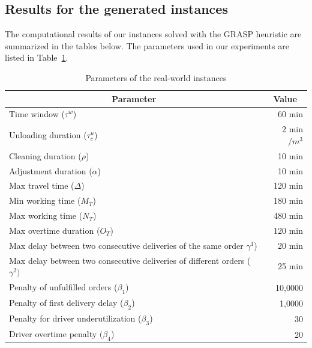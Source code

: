 \documentclass{article}
\begin{document}
\subsection{Results for the generated instances}

The computational results of our instances solved with the GRASP heuristic are summarized in the tables below. %
The parameters used in our experiments are listed in Table~\ref*{tab:problem_parameters}.

\begin{table}[hbt]
    \centering
    \caption{Parameters of the real-world instances}
    \label{tab:problem_parameters}
    \small
    \begin{tabularx}{\textwidth}{Xr}
        \toprule
        \multicolumn{1}{c}{Parameter}  &
        \multicolumn{1}{c}{Value} \\ \midrule
 Time window ($\tau^w$)  & 60 min    \\
 Unloading duration ($\tau_c^u$)  & 2 min$/m^3$   \\
 Cleaning duration ($\rho$)    & 10 min  \\
        Adjustment duration ($\alpha$)                                                & 10 min                    \\
        Max travel time ($\Delta$)                                                    & 120 min                   \\
        Min working time ($M_T$)                                                      & 180 min                   \\
        Max working time ($N_T$)                                                      & 480 min                   \\
        Max overtime duration ($O_T$)                                                 & 120 min                   \\
        Max delay between two consecutive deliveries of the same order $\gamma^1$)   & 20 min                    \\
        Max delay between two consecutive deliveries of different orders ($\gamma^2)$ & 25 min                    \\
        Penalty of unfulfilled orders ($\beta_1$)                                     & 10,0000                   \\
        Penalty of first delivery delay ($\beta_2$)                                   & 1,0000                    \\
        Penalty for driver underutilization  ($\beta_3$)                              & 30                        \\
        Driver overtime penalty $ (\beta_4$)                                          & 20                        \\
        \bottomrule
    \end{tabularx}
\end{table}
\end{document}
